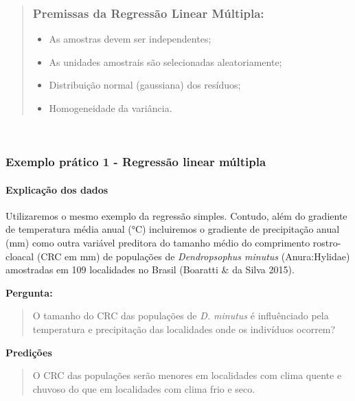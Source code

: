 \documentclass[
]{book}
\providecommand{\tightlist}{%
  \setlength{\itemsep}{0pt}\setlength{\parskip}{0pt}}
\begin{document}
\begin{quote}
\hypertarget{premissas-da-regressuxe3o-linear-muxfaltipla}{%
\subsubsection{Premissas da Regressão Linear Múltipla:}\label{premissas-da-regressuxe3o-linear-muxfaltipla}}

\begin{itemize}
\tightlist
\item
  As amostras devem ser independentes;
\item
  As unidades amostrais são selecionadas aleatoriamente;
\item
  Distribuição normal (gaussiana) dos resíduos;
\item
  Homogeneidade da variância.
\end{itemize}
\end{quote}

~

\hypertarget{exemplo-pruxe1tico-1---regressuxe3o-linear-muxfaltipla}{%
\subsubsection{Exemplo prático 1 - Regressão linear múltipla}\label{exemplo-pruxe1tico-1---regressuxe3o-linear-muxfaltipla}}

\hypertarget{explicauxe7uxe3o-dos-dados-5}{%
\paragraph{Explicação dos dados}\label{explicauxe7uxe3o-dos-dados-5}}

Utilizaremos o mesmo exemplo da regressão simples. Contudo, além do gradiente de temperatura média anual (°C) incluiremos o gradiente de precipitação anual (mm) como outra variável preditora do tamanho médio do comprimento rostro-cloacal (CRC em mm) de populações de \emph{Dendropsophus minutus} (Anura:Hylidae) amostradas em 109 localidades no Brasil (Boaratti \& da Silva 2015).

\textbf{Pergunta:}

\begin{quote}
O tamanho do CRC das populações de \emph{D. minutus} é influênciado pela temperatura e precipitação das localidades onde os indivíduos ocorrem?
\end{quote}

\textbf{Predições}

\begin{quote}
O CRC das populações serão menores em localidades com clima quente e chuvoso do que em localidades com clima frio e seco.
\end{quote}
\end{document}
